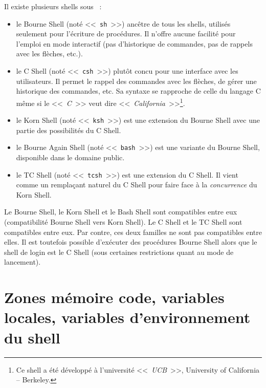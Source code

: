 Il existe plusieurs shells sous {\Unix}~:
\begin{itemize}
	\item	le Bourne Shell (not{\'e} <<~\texttt{sh}~>>) anc{\^e}tre de tous les shells,
			utilis{\'e}s seulement pour l'{\'e}criture de proc{\'e}dures. Il n'offre aucune
			facilit{\'e} pour l'emploi en mode interactif (pas d'historique de
			commandes, pas de rappels avec les fl{\`e}ches, etc.).
	\item	le C Shell (not{\'e} <<~\texttt{csh}~>>) plut{\^o}t concu pour une interface avec
			les utilisateurs. Il permet le rappel des commandes avec les fl{\`e}ches,
			de g{\'e}rer une historique des commandes, etc. Sa syntaxe
			se rapproche de celle du langage C m{\^e}me si le <<~\textsl{C}~>>
			veut dire <<~\textsl{California}~>>\footnote{Ce shell a {\'e}t{\'e} d{\'e}velopp{\'e} {\`a}
			l'universit{\'e} <<~\textsl{UCB}~>>, University of California -- Berkeley.}.
	\item	le Korn Shell (not{\'e} <<~\texttt{ksh}~>>) est une extension du Bourne Shell
			avec une partie des possibilit{\'e}s du C Shell.
	\item	le Bourne Again Shell (not{\'e} <<~\texttt{bash}~>>) est une variante du Bourne Shell,
			disponible dans le domaine public.
	\item	le TC Shell (not{\'e} <<~\texttt{tcsh}~>>) est une extension du C Shell. Il
			vient comme un rempla\c{c}ant naturel du C Shell pour faire face {\`a} la
			{\it concurrence} du Korn Shell.
\end{itemize}

Le Bourne Shell, le Korn Shell et le Bash Shell sont compatibles entre
eux (compatibilit{\'e} Bourne Shell vers Korn Shell). Le C Shell et le TC
Shell sont compatibles entre eux. Par contre, ces deux familles ne sont
pas compatibles entre elles. Il est toutefois possible d'ex{\'e}cuter des
proc{\'e}dures Bourne Shell alors que le shell de login est le C Shell (sous
certaines restrictions quant au mode de lancement).

\section{\label{basicn-codevar}Zones m{\'e}moire code, variables locales, variables d'environnement du shell}

